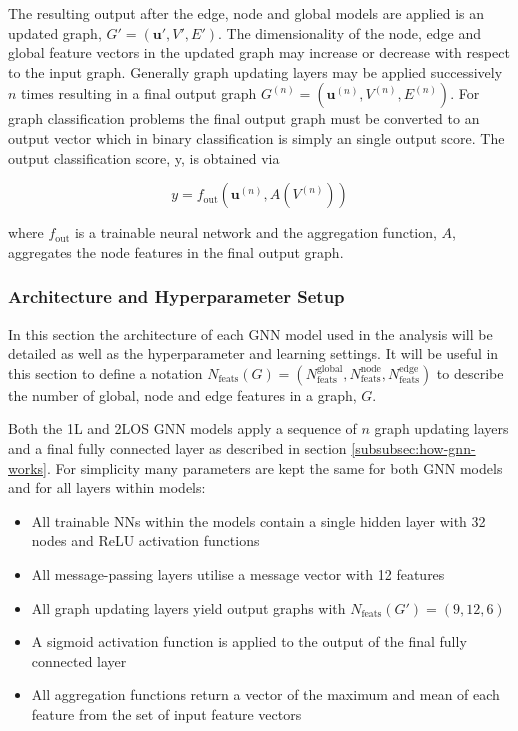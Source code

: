 The resulting output after the edge, node and global models are applied is an updated graph, $G'=(\textbf{u}',V',E')$. The dimensionality of the node, edge and global feature vectors in the updated graph may increase or decrease with respect to the input graph. Generally graph updating layers may be applied successively $n$ times resulting in a final output graph $G^{(n)}=(\textbf{u}^{(n)},V^{(n)},E^{(n)})$. For graph classification problems the final output graph must be converted to an output vector which in binary classification is simply an single output score. The output classification score, y, is obtained via

\begin{equation}
    y=f_\mathrm{out}(\textbf{u}^{(n)}, A(V^{(n)}))
\end{equation}
 
 where $f_\mathrm{out}$ is a trainable neural network and the aggregation function, $A$, aggregates the node features in the final output graph. 

\label{subsubsec:how-gnn-works}



\subsubsection{Architecture and Hyperparameter Setup}

In this section the architecture of each GNN model used in the analysis will be detailed as well as the hyperparameter and learning settings. It will be useful in this section to define a notation  $N_\mathrm{feats}(G)=(N^\mathrm{global}_\mathrm{feats},N^\mathrm{node}_\mathrm{feats},N^\mathrm{edge}_\mathrm{feats})$ to describe the number of global, node and edge features in a graph, $G$. 

Both the 1L and 2LOS GNN models apply a sequence of $n$ graph updating layers and a final fully connected layer as described in section \ref{subsubsec:how-gnn-works}. For simplicity many parameters are kept the same for both GNN models and for all layers within models:
\begin{itemize}
    \item All trainable NNs within the models contain a single hidden layer with 32 nodes and ReLU activation functions
    \item All message-passing layers utilise a message vector with 12 features
    \item All graph updating layers yield output graphs with $N_\mathrm{feats}(G')=(9,12,6)$
    \item A sigmoid activation function is applied to the output of the final fully connected layer
    \item All aggregation functions return a vector of the maximum and mean of each feature from the set of input feature vectors
\end{itemize}

